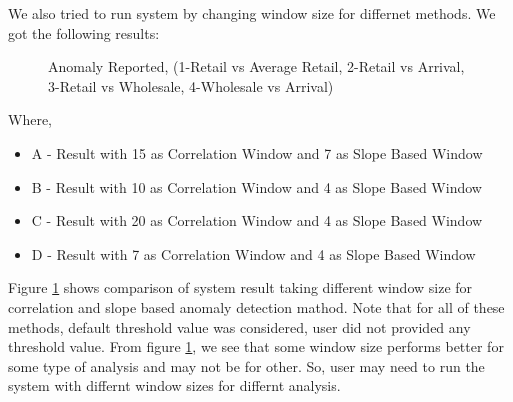 \documentclass[a4paper,10pt]{article}
\begin{document}
We also tried to run system by changing window size for differnet methods. We got the following results:
		
\begin{figure}[H]
\centering
{}
\caption{Anomaly Reported, (1-Retail vs Average Retail, 2-Retail vs Arrival, 3-Retail vs Wholesale, 4-Wholesale vs Arrival)}
\label{fig:comparisonMultipleWindows}
\end{figure}

Where,
\begin{itemize}
 \item A - Result with 15 as Correlation Window and 7 as Slope Based Window
 \item B - Result with 10 as Correlation Window and 4 as Slope Based Window
 \item C - Result with 20 as Correlation Window and 4 as Slope Based Window
 \item D - Result with 7 as Correlation Window and 4 as Slope Based Window
\end{itemize}


Figure \ref{fig:comparisonMultipleWindows} shows comparison of system result taking different window size for correlation and slope based anomaly detection mathod. Note that for all of these methods, default threshold value was considered, user did not provided any threshold value. From figure \ref{fig:comparisonMultipleWindows}, we see that some window size performs better for some type of analysis and may not be for other. So, user may need to run the system with differnt window sizes for differnt analysis. 
\end{document}
